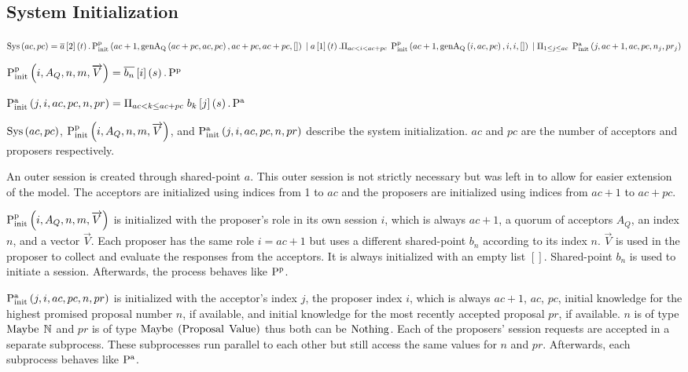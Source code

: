 \subsection{System Initialization}
\newcommand{\SessionRequest}[3]{\overline{#1}\left[#2\right]\left(#3\right)}
\newcommand{\SessionAccept}[3]{#1\left[#2\right]\left(#3\right)}
\newcommand{\ParallelFor}[1]{\Pi_{#1}\;}
\newcommand{\VectorV}[0]{\overrightarrow{V}}

$\Sys{ac}{pc} = \SessionRequest{a}{2}{t} . \PpInit{ac + 1}{\genAq{ac + pc}{ac}{pc}}{ac + pc}{ac + pc}{[]}\\
\Or \SessionAccept{a}{1}{t} . \ParallelFor{ac < i < ac + pc} \PpInit{ac + 1}{\genAq{i}{ac}{pc}}{i}{i}{[]} \\
\Or \ParallelFor{1 \le j \le ac} \PaInit{j}{ac + 1}{ac}{pc}{n_j}{pr_j}$

$\PpInit{i}{A_Q}{n}{m}{\VectorV} = \SessionRequest{b_n}{i}{s} . \Pp$

$\PaInit{j}{i}{ac}{pc}{n}{pr} = \ParallelFor{ac < k \le ac + pc} \SessionAccept{b_k}{j}{s} . \Pa$

$\operatorname{Sys}\left(ac, pc\right)$, $\PpInit{i}{A_Q}{n}{m}{\VectorV}$, and $\operatorname{P^a_{init}}\left(j, i, ac, pc, n, pr\right)$ describe the system initialization.
$ac$ and $pc$ are the number of acceptors and proposers respectively.

An outer session is created through shared-point $a$.
This outer session is not strictly necessary but was left in to allow for easier extension of the model.
The acceptors are initialized using indices from 1 to $ac$ and the proposers are initialized using indices from $ac + 1$ to $ac + pc$.

$\PpInit{i}{A_Q}{n}{m}{\VectorV}$ is initialized with the proposer's role in its own session $i$, which is always $ac + 1$, a quorum of acceptors $A_Q$, an index $n$, and a vector $\VectorV$.
Each proposer has the same role $i = ac + 1$ but uses a different shared-point $b_n$ according to its index $n$.
$\VectorV$ is used in the proposer to collect and evaluate the responses from the acceptors.
It is always initialized with an empty list $[]$.
Shared-point $b_n$ is used to initiate a session.
Afterwards, the process behaves like $\operatorname{P^p}$.

$\operatorname{P^a_{init}}\left(j, i, ac, pc, n, pr\right)$ is initialized with the acceptor's index $j$, the proposer index $i$, which is always $ac + 1$, $ac$, $pc$, initial knowledge for the highest promised proposal number $n$, if available, and initial knowledge for the most recently accepted proposal $pr$, if available.
$n$ is of type $\operatorname{Maybe}\; \mathbb{N}$ and $pr$ is of type $\operatorname{Maybe}\; \left(\operatorname{Proposal}\; \operatorname{Value}\right)$ thus both can be $\operatorname{Nothing}$.
Each of the proposers' session requests are accepted in a separate subprocess.
These subprocesses run parallel to each other but still access the same values for $n$ and $pr$.
Afterwards, each subprocess behaves like $\operatorname{P^a}$.

